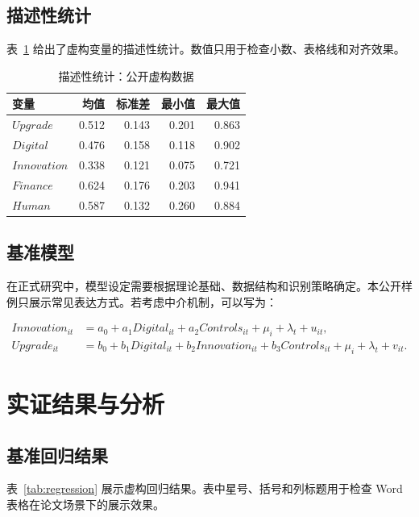 \documentclass[12pt]{ctexbook}
\begin{document}
\section{描述性统计}
表~\ref{tab:summary} 给出了虚构变量的描述性统计。数值只用于检查小数、表格线和对齐效果。

\begin{table}[htbp]
\centering
\caption{描述性统计：公开虚构数据}
\label{tab:summary}
\begin{tabular}{lrrrr}
\toprule
变量 & 均值 & 标准差 & 最小值 & 最大值 \\
\midrule
$Upgrade$ & 0.512 & 0.143 & 0.201 & 0.863 \\
$Digital$ & 0.476 & 0.158 & 0.118 & 0.902 \\
$Innovation$ & 0.338 & 0.121 & 0.075 & 0.721 \\
$Finance$ & 0.624 & 0.176 & 0.203 & 0.941 \\
$Human$ & 0.587 & 0.132 & 0.260 & 0.884 \\
\bottomrule
\end{tabular}
\end{table}

\section{基准模型}
在正式研究中，模型设定需要根据理论基础、数据结构和识别策略确定。本公开样例只展示常见表达方式。若考虑中介机制，可以写为：

\begin{align}
Innovation_{it} &= a_0+a_1 Digital_{it}+a_2 Controls_{it}+\mu_i+\lambda_t+u_{it}, \\
Upgrade_{it} &= b_0+b_1 Digital_{it}+b_2 Innovation_{it}+b_3 Controls_{it}+\mu_i+\lambda_t+v_{it}.
\end{align}

\chapter{实证结果与分析}
\section{基准回归结果}
表~\ref{tab:regression} 展示虚构回归结果。表中星号、括号和列标题用于检查 Word 表格在论文场景下的展示效果。
\end{document}
